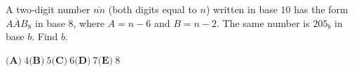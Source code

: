 A two-digit number $\overline{nn}$ (both digits equal to $n$) written in base $10$ has the form $\overline{AAB}_8$ in base $8$, where $A=n-6$ and $B=n-2$. The same number is $205_b$ in base $b$. Find $b$.

$\textbf{(A)}\ 4$\qquad$\textbf{(B)}\ 5$\qquad$\textbf{(C)}\ 6$\qquad$\textbf{(D)}\ 7$\qquad$\textbf{(E)}\ 8$
